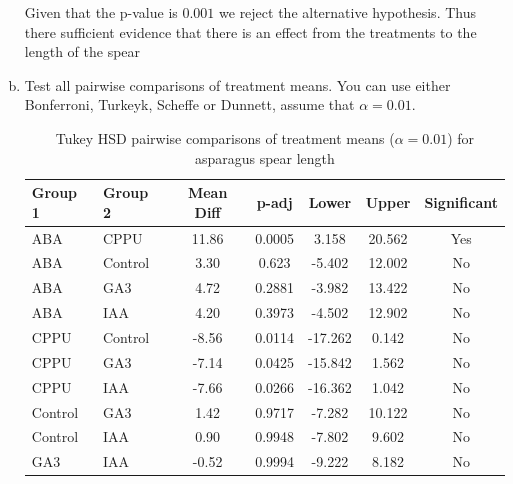 \documentclass{article}
\begin{document}
\begin{enumerate}[(a)]
	      Given that the p-value is $0.001$ we reject the alternative hypothesis. Thus there sufficient evidence that
	      there is an effect from the treatments to the length of the spear
	\item Test all pairwise comparisons of treatment means. You can use either Bonferroni, Turkeyk, Scheffe or Dunnett, assume that $\alpha = 0.01$.
	      \begin{table}[h!]
		      \centering
		      \caption{Tukey HSD pairwise comparisons of treatment means (\(\alpha = 0.01\)) for asparagus spear length}
		      \begin{tabular}{l l c c c c c}
			      \hline
			      \textbf{Group 1} & \textbf{Group 2} & \textbf{Mean Diff} & \textbf{p-adj} & \textbf{Lower} & \textbf{Upper} & \textbf{Significant} \\
			      \hline
			      ABA              & CPPU             & 11.86              & 0.0005         & 3.158          & 20.562         & Yes                  \\
			      ABA              & Control          & 3.30               & 0.623          & -5.402         & 12.002         & No                   \\
			      ABA              & GA3              & 4.72               & 0.2881         & -3.982         & 13.422         & No                   \\
			      ABA              & IAA              & 4.20               & 0.3973         & -4.502         & 12.902         & No                   \\
			      CPPU             & Control          & -8.56              & 0.0114         & -17.262        & 0.142          & No                   \\
			      CPPU             & GA3              & -7.14              & 0.0425         & -15.842        & 1.562          & No                   \\
			      CPPU             & IAA              & -7.66              & 0.0266         & -16.362        & 1.042          & No                   \\
			      Control          & GA3              & 1.42               & 0.9717         & -7.282         & 10.122         & No                   \\
			      Control          & IAA              & 0.90               & 0.9948         & -7.802         & 9.602          & No                   \\
			      GA3              & IAA              & -0.52              & 0.9994         & -9.222         & 8.182          & No                   \\
			      \hline
		      \end{tabular}
	      \end{table}


\end{enumerate}
\end{document}
